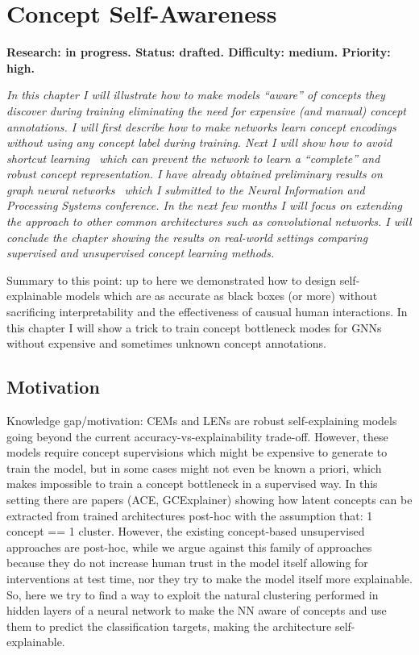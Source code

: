 \chapter{Concept Self-Awareness} \label{chapter:unsupervised}
\textbf{Research: in progress. Status: drafted. Difficulty: medium. Priority: high.}

\textit{In this chapter I will illustrate how to make models ``aware'' of concepts they discover during training eliminating the need for expensive (and manual) concept annotations. I will first describe how to make networks learn concept encodings without using any concept label during training. Next I will show how to avoid \textit{shortcut learning}~\citep{geirhos2020shortcut} which can prevent the network to learn a ``complete'' and robust concept representation. I have already obtained preliminary results on graph neural networks~\citep{magister2022encoding} which I submitted to the Neural Information and Processing Systems conference. In the next few months I will focus on extending the approach to other common architectures such as convolutional networks. I will conclude the chapter showing the results on real-world settings comparing supervised and unsupervised concept learning methods.}


Summary to this point: up to here we demonstrated how to design self-explainable models which are as accurate as black boxes (or more) without sacrificing interpretability and the effectiveness of causual human interactions. In this chapter I will show a trick to train concept bottleneck modes for GNNs without expensive and sometimes unknown concept annotations.

\section{Motivation}
Knowledge gap/motivation: CEMs and LENs are robust self-explaining models going beyond the current accuracy-vs-explainability trade-off. However, these models require concept supervisions which might be expensive to generate to train the model, but in some cases might not even be known a priori, which makes impossible to train a concept bottleneck in a supervised way. In this setting there are papers (ACE, GCExplainer) showing how latent concepts can be extracted from trained architectures post-hoc with the assumption that: 1 concept == 1 cluster. However, the existing concept-based unsupervised approaches are post-hoc, while we argue against this family of approaches because they do not increase human trust in the model itself allowing for interventions at test time, nor they try to make the model itself more explainable. So, here we try to find a way to exploit the natural clustering performed in hidden layers of a neural network to make the NN aware of concepts and use them to predict the classification targets, making the architecture self-explainable.

